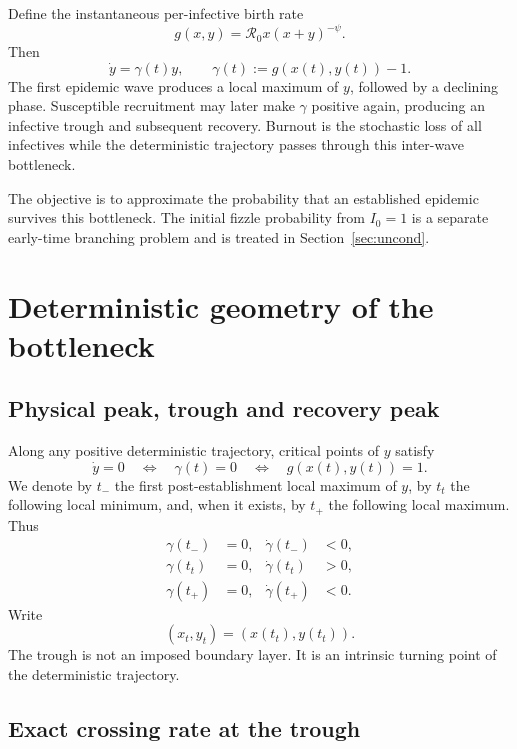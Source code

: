 \documentclass[11pt]{article}
\newcommand{\Rzero}{\mathcal R_0}
\newcommand{\gam}{\gamma}
\begin{document}
Define the instantaneous per-infective birth rate
\begin{equation}
 g(x,y)=\Rzero x(x+y)^{-\psi}.\label{eq:gdef}
\end{equation}
Then
\begin{equation}
 \dot y=\gam(t)y,
 \qquad
 \gam(t):=g(x(t),y(t))-1.\label{eq:gammadef}
\end{equation}
The first epidemic wave produces a local maximum of \(y\), followed by a declining phase. Susceptible recruitment may later make \(\gam\) positive again, producing an infective trough and subsequent recovery. Burnout is the stochastic loss of all infectives while the deterministic trajectory passes through this inter-wave bottleneck.

The objective is to approximate the probability that an established epidemic survives this bottleneck. The initial fizzle probability from \(I_0=1\) is a separate early-time branching problem and is treated in Section~\ref{sec:uncond}.

\section{Deterministic geometry of the bottleneck}

\subsection{Physical peak, trough and recovery peak}

Along any positive deterministic trajectory, critical points of \(y\) satisfy
\[
\dot y=0
\quad\Longleftrightarrow\quad
\gam(t)=0
\quad\Longleftrightarrow\quad
 g(x(t),y(t))=1.
\]
We denote by \(t_-\) the first post-establishment local maximum of \(y\), by \(t_t\) the following local minimum, and, when it exists, by \(t_+\) the following local maximum. Thus
\begin{align*}
\gam(t_-)&=0, & \dot\gam(t_-) &<0,\\
\gam(t_t)&=0, & \dot\gam(t_t) &>0,\\
\gam(t_+)&=0, & \dot\gam(t_+) &<0.
\end{align*}
Write
\[
(x_t,y_t)=(x(t_t),y(t_t)).
\]
The trough is not an imposed boundary layer. It is an intrinsic turning point of the deterministic trajectory.

\subsection{Exact crossing rate at the trough}
\end{document}
